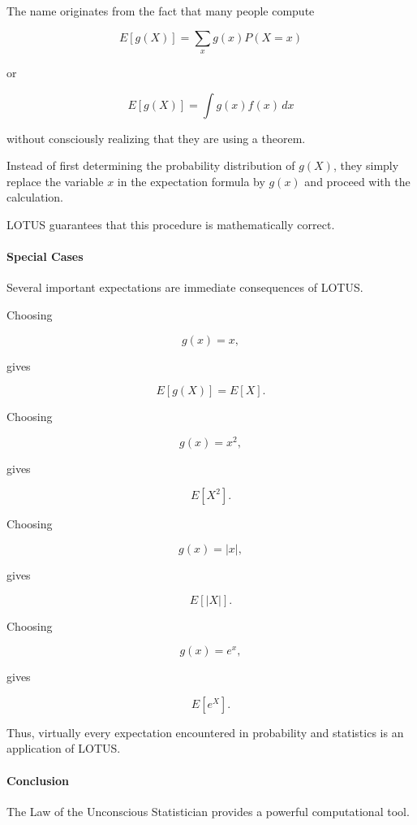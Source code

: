 \documentclass[11pt]{article}
\begin{document}
\begin{mdframed}[
		linewidth=0.8pt,
		roundcorner=6pt,
		backgroundcolor=gray!5,
		linecolor=gray!60,
		innertopmargin=10pt,
		innerbottommargin=10pt,
		innerleftmargin=10pt,
		innerrightmargin=10pt
		]
		The name originates from the fact that many people compute
		
		\[
		E[g(X)]
		=
		\sum_xg(x)P(X=x)
		\]
		
		or
		
		\[
		E[g(X)]
		=
		\int g(x)f(x)\,dx
		\]
		
		without consciously realizing that they are using a theorem.
		
		Instead of first determining the probability distribution of $g(X)$, they
		simply replace the variable $x$ in the expectation formula by $g(x)$ and
		proceed with the calculation.
		
		LOTUS guarantees that this procedure is mathematically correct.
		
		\bigskip
		
		\paragraph{Special Cases}
		
		Several important expectations are immediate consequences of LOTUS.
		
		Choosing
		
		\[
		g(x)=x,
		\]
		
		gives
		
		\[
		E[g(X)]
		=
		E[X].
		\]
		
		Choosing
		
		\[
		g(x)=x^2,
		\]
		
		gives
		
		\[
		E[X^2].
		\]
		
		Choosing
		
		\[
		g(x)=|x|,
		\]
		
		gives
		
		\[
		E[|X|].
		\]
		
		Choosing
		
		\[
		g(x)=e^x,
		\]
		
		gives
		
		\[
		E[e^X].
		\]
		
		Thus, virtually every expectation encountered in probability and statistics
		is an application of LOTUS.
		
		\bigskip
		
		\paragraph{Conclusion}
		
		The Law of the Unconscious Statistician provides a powerful computational
		tool.
		

\end{mdframed}
\end{document}
